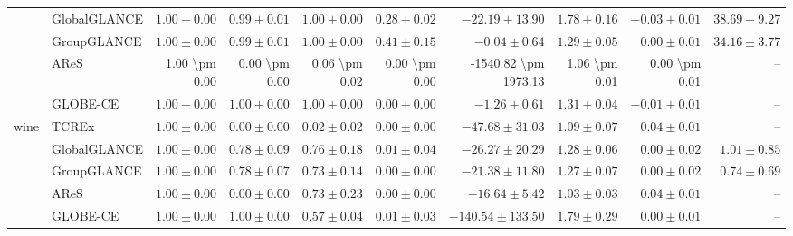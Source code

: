 \begin{table}[ht]
\begin{center}
\begin{sc}
\begin{scriptsize}
\begin{tabular}{l|l|rrrrrrrr}
 & GlobalGLANCE & $\boldsymbol{1.00\pm{0.00}}$ & $0.99\pm{0.01}$ & $\boldsymbol{1.00\pm{0.00}}$ & $0.28\pm{0.02}$ & $-22.19\pm{13.90}$ & $1.78\pm{0.16}$ & $-0.03\pm{0.01}$ & $38.69\pm{9.27}$ \\
 & GroupGLANCE & $\boldsymbol{1.00\pm{0.00}}$ & $0.99\pm{0.01}$ & $\boldsymbol{1.00\pm{0.00}}$ & $\boldsymbol{0.41\pm{0.15}}$ & $\boldsymbol{-0.04\pm{0.64}}$ & $1.29\pm{0.05}$ & $\boldsymbol{0.00\pm{0.01}}$ & $\boldsymbol{34.16\pm{3.77}}$ \\
 & AReS & 1.00 \textbackslash{}pm 0.00 & 0.00 \textbackslash{}pm 0.00 & 0.06 \textbackslash{}pm 0.02 & 0.00 \textbackslash{}pm 0.00 & -1540.82 \textbackslash{}pm 1973.13 & 1.06 \textbackslash{}pm 0.01 & 0.00 \textbackslash{}pm 0.01 & -- \\
 & GLOBE-CE & $\boldsymbol{1.00\pm{0.00}}$ & $\boldsymbol{1.00\pm{0.00}}$ & $\boldsymbol{1.00\pm{0.00}}$ & $0.00\pm{0.00}$ & $-1.26\pm{0.61}$ & $1.31\pm{0.04}$ & $-0.01\pm{0.01}$ & -- \\
\midrule
\multirow{5}{*}{wine} & TCREx & $\boldsymbol{1.00\pm{0.00}}$ & $0.00\pm{0.00}$ & $0.02\pm{0.02}$ & $0.00\pm{0.00}$ & $-47.68\pm{31.03}$ & $1.09\pm{0.07}$ & $\boldsymbol{0.04\pm{0.01}}$ & -- \\
 & GlobalGLANCE & $\boldsymbol{1.00\pm{0.00}}$ & $0.78\pm{0.09}$ & $\boldsymbol{0.76\pm{0.18}}$ & $\boldsymbol{0.01\pm{0.04}}$ & $-26.27\pm{20.29}$ & $1.28\pm{0.06}$ & $0.00\pm{0.02}$ & $1.01\pm{0.85}$ \\
 & GroupGLANCE & $\boldsymbol{1.00\pm{0.00}}$ & $0.78\pm{0.07}$ & $0.73\pm{0.14}$ & $0.00\pm{0.00}$ & $-21.38\pm{11.80}$ & $1.27\pm{0.07}$ & $0.00\pm{0.02}$ & $\boldsymbol{0.74\pm{0.69}}$ \\
 & AReS & $\boldsymbol{1.00\pm{0.00}}$ & $0.00\pm{0.00}$ & $0.73\pm{0.23}$ & $0.00\pm{0.00}$ & $\boldsymbol{-16.64\pm{5.42}}$ & $\boldsymbol{1.03\pm{0.03}}$ & $\boldsymbol{0.04\pm{0.01}}$ & -- \\
 & GLOBE-CE & $\boldsymbol{1.00\pm{0.00}}$ & $\boldsymbol{1.00\pm{0.00}}$ & $0.57\pm{0.04}$ & $\boldsymbol{0.01\pm{0.03}}$ & $-140.54\pm{133.50}$ & $1.79\pm{0.29}$ & $0.00\pm{0.01}$ & -- \\
\bottomrule
\end{tabular}
\end{scriptsize}
\end{sc}
\end{center}
\end{table}
